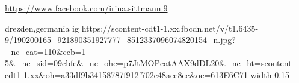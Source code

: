  
 
 
 
 

\url{https://www.facebook.com/irina.sittmann.9}\par
drezden,germania
\ifcmt
  ig https://scontent-cdt1-1.xx.fbcdn.net/v/t1.6435-9/190200165_921890351927777_8512337096074820154_n.jpg?_nc_cat=110&ccb=1-5&_nc_sid=09cbfe&_nc_ohc=p7JtMOPcatAAX9dDL20&_nc_ht=scontent-cdt1-1.xx&oh=a33df9b34158787f912f702e48aee8ec&oe=613E6C71
  width 0.15
\fi

